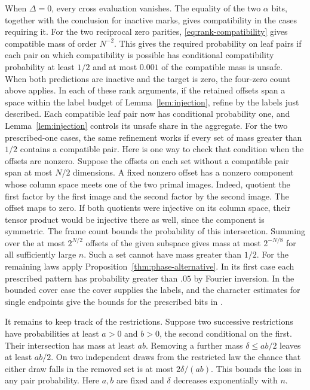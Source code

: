 When \(\Delta=0\), every cross evaluation vanishes. The equality
of the two \(\alpha\) bits, together with the conclusion for inactive
marks, gives compatibility in the cases requiring it. For the two reciprocal zero parities,
\eqref{eq:rank-compatibility} gives compatible mass of order \(N^{-2}\).
This gives the required probability on leaf pairs if each pair on
which compatibility is possible has conditional compatibility probability
at least \(1/2\) and at most \(0.001\) of the compatible mass is unsafe. When both predictions are inactive and the target
is zero, the four-zero count above applies. In each of these rank
arguments, if the retained offsets span a space within the label budget of
Lemma~\ref{lem:injection}, refine by the labels just described. Each
compatible leaf pair now has conditional probability one, and
Lemma~\ref{lem:injection} controls its unsafe share in the aggregate.
For the two prescribed-one cases, the same refinement works if every
set of mass greater than \(1/2\) contains a compatible pair. Here is one
way to check that condition when the offsets are nonzero. Suppose the
offsets on each set without a compatible pair span at most \(N/2\)
dimensions. A fixed nonzero offset has a nonzero component whose column
space meets one of the two primal images. Indeed, quotient the first
factor by the first image and the second factor by the second image.
The offset maps to zero. If both quotients were injective on its column
space, their tensor product would be injective there as well, since
the component is symmetric. The frame count bounds the probability of
this intersection. Summing over the at most \(2^{N/2}\) offsets of the
given subspace gives mass at most \(2^{-N/8}\) for all sufficiently
large \(n\). Such a set cannot have mass greater than \(1/2\).
For the remaining laws apply Proposition~\ref{thm:phase-alternative}.
In its first case each prescribed pattern has probability greater than
\(.05\) by Fourier inversion. In the bounded cover case the cover
supplies the labels, and the character estimates for single endpoints
give the bounds for the prescribed bits in .

It remains to keep track of the restrictions. Suppose two successive
restrictions have probabilities at least \(a>0\) and \(b>0\), the
second conditional on the first. Their intersection has mass at least
\(ab\). Removing a further mass \(\delta\le ab/2\) leaves at least
\(ab/2\). On two independent draws from the restricted law the chance
that either draw falls in the removed set is at most \(2\delta/(ab)\).
This bounds the loss in any pair probability. Here \(a,b\) are fixed
and \(\delta\) decreases exponentially with \(n\).

